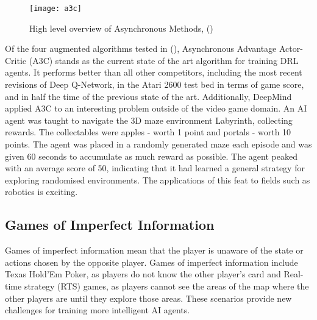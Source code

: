 \begin{figure}[H]
    \centering
    \texttt{[image: a3c]}
    \caption{High level overview of Asynchronous Methods, (\citet{a3cimage})}
\end{figure}

Of the four augmented algorithms tested in (\citet{a3c}), Asynchronous Advantage Actor-Critic (A3C) stands as the current state of the art algorithm for training DRL agents. It performs better than all other competitors, including the most recent revisions of Deep Q-Network, in the Atari 2600 test bed in terms of game score, and in half the time of the previous state of the art. Additionally, DeepMind applied A3C to an interesting problem outside of the video game domain. An AI agent was taught to navigate the 3D maze environment Labyrinth, collecting rewards. The collectables were apples - worth 1 point and portals - worth 10 points. The agent was placed in a randomly generated maze each episode and was given 60 seconds to accumulate as much reward as possible. The agent peaked with an average score of 50, indicating that it had learned a general strategy for exploring randomised environments. The applications of this feat to fields such as robotics is exciting.

\subsection{Games of Imperfect Information}
Games of imperfect information mean that the player is unaware of the state or actions chosen by the opposite player. Games of imperfect information include Texas Hold'Em Poker, as players do not know the other player's card and Real-time strategy (RTS) games, as players cannot see the areas of the map where the other players are until they explore those areas. These scenarios provide new challenges for training more intelligent AI agents.

